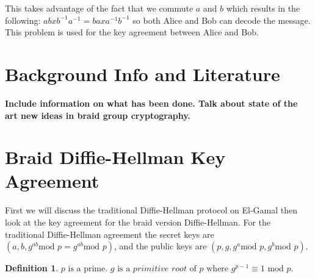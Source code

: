 \documentclass{article}
\theoremstyle{definition}
\newtheorem{definition}{Definition}[section]
\begin{document}
This takes advantage of the fact that we commute $a$ and $b$ which results in the following: $abxb^{-1}a^{-1}=baxa^{-1}b^{-1}$ so both Alice and Bob can decode the message. This problem is used for the key agreement between Alice and Bob.

\section{Background Info and Literature}
\textbf{Include information on what has been done. Talk about state of the art new ideas in braid group cryptography.}

\section{Braid Diffie-Hellman Key Agreement}
First we will discuss the traditional Diffie-Hellman protocol on El-Gamal then look at the key agreement for the braid version Diffie-Hellman. For the traditional Diffie-Hellman agreement the secret keys are $(a,b,g^{ab} \text{mod }p=g^{ab} \text{mod }p)$, and the public keys are $(p,g,g^a \text{mod }p,g^b \text{mod }p)$. 

\begin{definition}
$p \text{ is a prime. } g \text{ is a }\textit{primitive root } \text{of }p \text{ where }g^{p-1}\equiv 1 \text{ mod }p. $
\end{definition}
\end{document}
